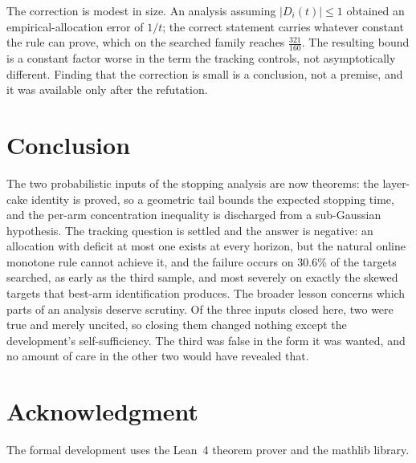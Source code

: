 The correction is modest in size. An analysis assuming $|D_{i}(t)|\le1$ obtained an
empirical-allocation error of $1/t$; the correct statement carries whatever constant the rule
can prove, which on the searched family reaches $\tfrac{321}{160}$. The resulting bound is a constant
factor worse in the term the tracking controls, not asymptotically different. Finding that the
correction is small is a conclusion, not a premise, and it was available only after the
refutation.

\section{Conclusion}

The two probabilistic inputs of the stopping analysis are now theorems: the layer-cake identity
is proved, so a geometric tail bounds the expected stopping time, and the per-arm concentration
inequality is discharged from a sub-Gaussian hypothesis. The tracking question is settled and
the answer is negative: an allocation with deficit at most one exists at every horizon, but the
natural online monotone rule cannot achieve it, and the failure occurs on $30.6\%$ of
the targets searched, as early as the third sample, and most severely on exactly the skewed
targets that best-arm identification produces. The broader lesson concerns which parts of an
analysis deserve scrutiny. Of the three inputs closed here, two were true and merely uncited,
so closing them changed nothing except the development's self-sufficiency. The third was false
in the form it was wanted, and no amount of care in the other two would have revealed that.

\section*{Acknowledgment}

The formal development uses the Lean~4 theorem prover and the mathlib library.

